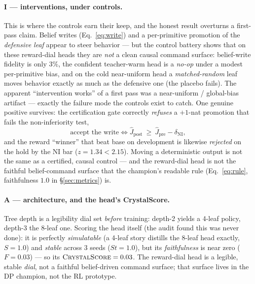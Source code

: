 \documentclass[11pt]{article}
\begin{document}
\paragraph{I --- interventions, under controls.} This is where the controls earn their keep, and
the honest result overturns a first-pass claim. Belief writes (Eq.~\ref{eq:write}) and a
per-primitive promotion of the \emph{defensive leaf} appear to steer behavior --- but the
control battery shows that on these reward-dial heads they are \emph{not} a clean causal command
surface: belief-write fidelity is only $3\%$, the confident teacher-warm head is a \emph{no-op}
under a modest per-primitive bias, and on the cold near-uniform head a \emph{matched-random}
leaf moves behavior exactly as much as the defensive one (the placebo fails). The apparent
``intervention works'' of a first pass was a near-uniform / global-bias artifact --- exactly the
failure mode the controls exist to catch. One genuine positive survives: the certification
gate correctly \emph{refuses} a $+1$-nat promotion that fails the non-inferiority test,
\begin{equation}
\text{accept the write} \iff \widehat{J}_{\text{post}} \ \ge\ \widehat{J}_{\text{pre}} -
\delta_{\text{NI}},
\label{eq:ni}
\end{equation}
and the reward ``winner'' that beat base on development is likewise \emph{rejected} on the hold
by the NI bar ($z=1.34 < 2.15$). Moving a deterministic output is not the same as a certified,
causal control --- and the reward-dial head is not the faithful belief-command surface that the
champion's readable rule (Eq.~\ref{eq:rule}, faithfulness $1.0$ in \S\ref{sec:metrics}) is.

\paragraph{A --- architecture, and the head's CrystalScore.} Tree depth is a legibility dial set
\emph{before} training: depth-2 yields a 4-leaf policy, depth-3 the 8-leaf one. Scoring the head
itself (the audit found this was never done): it is perfectly \emph{simulatable} (a 4-leaf story
distills the 8-leaf head exactly, $S=1.0$) and \emph{stable} across 3 seeds ($S\!t=1.0$), but its
\emph{faithfulness} is near zero ($F=0.03$) --- so its $\textsc{CrystalScore}=0.03$. The
reward-dial head is a legible, stable \emph{dial}, not a faithful belief-driven command surface;
that surface lives in the DP champion, not the RL prototype.
\end{document}
